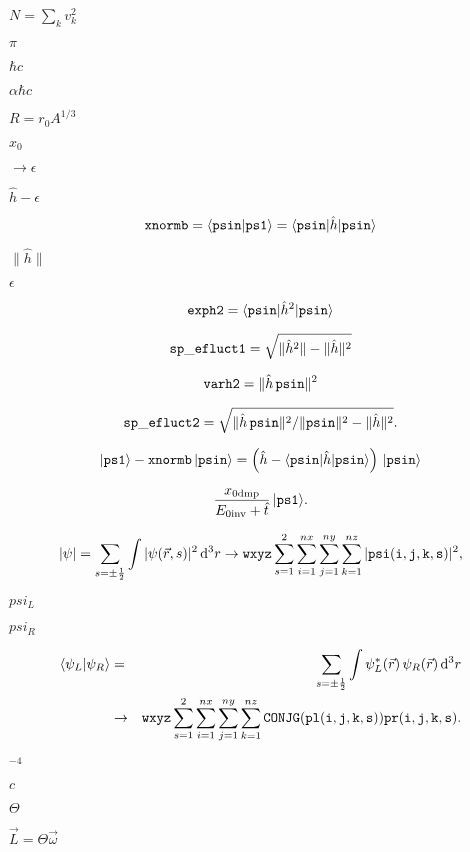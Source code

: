 \documentclass{article}
\begin{document}
$ N=\sum_k v_k^2 $
\pagebreak

$ \pi $
\pagebreak

$ \hbar c $
\pagebreak

$ \alpha\hbar c $
\pagebreak

$ R=r_0A^{1/3} $
\pagebreak

$ x_0 $
\pagebreak

$ \rightarrow\epsilon $
\pagebreak

$ \hat h-\epsilon $
\pagebreak

\[ {\tt xnormb}=\langle {\tt psin}|{\tt ps1}\rangle=\langle {\tt psin}|\hat h|{\tt psin}\rangle\]
\pagebreak

$ \|\hat h\| $
\pagebreak

$ \epsilon $
\pagebreak

\[ {\tt exph2}=\langle {\tt psin}|\hat h^2|{\tt psin}\rangle \]
\pagebreak

\[ {\tt sp\_efluct1}=\sqrt{\|\hat h^2\|-\|\hat h\|^2} \]
\pagebreak

\[ {\tt varh2}=\|\hat h\,{\tt psin}\|^2 \]
\pagebreak

\[ {\tt sp\_efluct2}=\sqrt{\|\hat h\,{\tt psin}\|^2/\|{\tt psin}\|^2-\|\hat h\|^2}. \]
\pagebreak

\[ |{\tt ps1}\rangle-{\tt xnormb}\,|{\tt psin}\rangle=\left(\hat h -\langle {\tt psin}|\hat h|{\tt psin}\rangle\right)\,|{\tt psin}\rangle \]
\pagebreak

\[ \frac{x_{0\rm dmp}}{E_{0\rm inv}+\hat t}\,|{\tt ps1}\rangle. \]
\pagebreak

\[ |\psi|=\sum_{s=\pm{1\over2}}\int |\psi(\vec r,s)|^2\,{\mathrm d}^3 r\rightarrow {\tt wxyz}\sum_{s=1}^2 \sum_{i=1}^{nx}\sum_{j=1}^{ny}\sum_{k=1}^{nz} |{\tt psi(i,j,k,s)}|^2, \]
\pagebreak

$ psi_L $
\pagebreak

$ psi_R $
\pagebreak

\begin{eqnarray} \langle\psi_L|\psi_R\rangle&=&\sum_{s=\pm{1\over2}}\int \psi_L^*(\vec r)\,\psi_R(\vec r)\,{\mathrm d}^3 r \\ &\rightarrow& {\tt wxyz}\sum_{s=1}^2 \sum_{i=1}^{nx}\sum_{j=1}^{ny}\sum_{k=1}^{nz} {\tt CONJG(pl(i,j,k,s))pr(i,j,k,s)}. \end{eqnarray}
\pagebreak

$^{-4}$
\pagebreak

$c$
\pagebreak

$\Theta$
\pagebreak

$\vec L=\Theta\vec\omega$
\pagebreak
\end{document}
